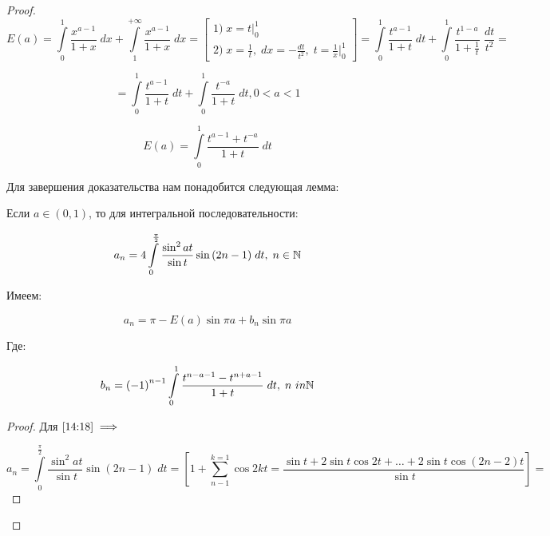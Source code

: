 \documentclass[../../main.tex]{subfiles}
\begin{document}
	\begin{proof}
		\[  E(a) =  \int\limits_{0}^{1}  \frac{x^{a-1}}{1+x} \; dx + \int\limits_{1}^{+\infty} \frac{x^{a-1}}{1+x} \; dx  = \left[  \begin{gathered}
	    1) \; x = t \bigg|_{0}^{1} \\
		2) \; 	x = \frac{1}{t}, \; dx = - \frac{dt}{t^2}, \; t = \frac{1}{x}  \bigg|_{0}^{1}
		\end{gathered}  \right] = \int\limits_{0}^{1} \frac{t^{a-1}}{1+t} \; dt + \int\limits_{0}^{1} \frac{t^{1-a}}{1+\frac{1}{t}} \; \frac{dt}{t^2} =      \]
		
		\[  = \int\limits_{0}^{1} \frac{t^{a-1}}{1+t} \; dt +  \int\limits_{0}^{1} \frac{t^{-a}}{1+t} \; dt, 0<a<1       \]
		
		\begin{equation}
		\label{14:17}
		  E(a) =  \int\limits_{0}^{1}  \frac{t^{a-1} + t^{-a}}{1+t} \; dt     
		\end{equation}
		
		Для завершения доказательства нам понадобится следующая лемма:
		
		\begin{lemma}
			
			Если $a \in (0,1)$, то для интегральной последовательности:
			
			\begin{equation}
			\label{14:18}
			a_n = 4 \int\limits_{0}^{\frac{\pi}{2}} \frac{\sin^2{at}}{\sin{t}} \sin{\left(2n-1 \right) } \; dt, \; n \in \mathbb{N}
			\end{equation}
			
			Имеем:
			
			\begin{equation}
			\label{14:19}
			a_n = \pi - E(a) \sin{\pi a} + b_n \sin{\pi a}
			\end{equation}
			
			Где:
			
			\begin{equation}
			\label{14:20}
			b_n = \left( - 1 \right)^{n-1} \int\limits_{0}^{1} \frac{t^{n-a-1} - t^{n+a-1} }{1+t} \; dt, \; n\ in \mathbb{N}
			\end{equation}
		\end{lemma}	
			\begin{proof}
				Для $\eqref{14:18} \implies $
				
				\[   a_n =  \int\limits_{0}^{\frac{\pi}{2}} \frac{\sin^2{at}}{\sin{t}} \sin{\left(2n-1 \right) } \; dt = \left[ 1 + \sum_{n-1}^{k = 1} \cos{2k t} = \frac{\sin{t} + 2 \sin{t} \cos{2t} + \dots + 2\sin{t} \cos{(2n - 2)t}}{\sin{t}} \right]   =   \]
				

\end{proof}
\end{proof}
\end{document}
